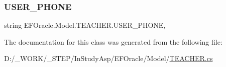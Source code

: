 \subsubsection{\texorpdfstring{U\+S\+E\+R\+\_\+\+P\+H\+O\+NE}{USER\_PHONE}}
{\footnotesize\ttfamily string E\+F\+Oracle.\+Model.\+T\+E\+A\+C\+H\+E\+R.\+U\+S\+E\+R\+\_\+\+P\+H\+O\+NE\hspace{0.3cm}{\ttfamily [get]}, {\ttfamily [set]}}



The documentation for this class was generated from the following file\+:\begin{DoxyCompactItemize}
\item 
D\+:/\+\_\+\+W\+O\+R\+K/\+\_\+\+S\+T\+E\+P/\+In\+Study\+Asp/\+E\+F\+Oracle/\+Model/\hyperlink{_t_e_a_c_h_e_r_8cs}{T\+E\+A\+C\+H\+E\+R.\+cs}\end{DoxyCompactItemize}
